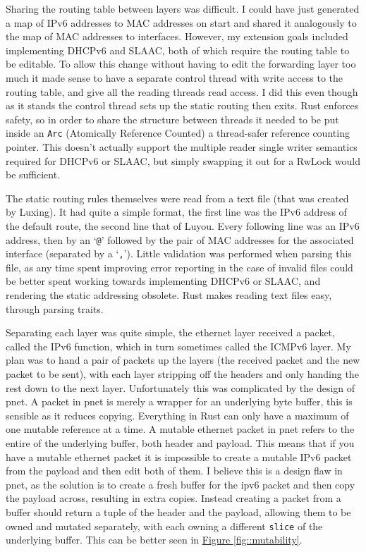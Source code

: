 \documentclass[12pt,a4paper,twoside,openright]{report}
\begin{document}
\bigskip

Sharing the routing table between layers was difficult.  I could have just generated a map of IPv6 addresses to MAC addresses on start and shared it analogously to the map of MAC addresses to interfaces. However, my extension goals included implementing DHCPv6 and SLAAC, both of which require the routing table to be editable.  To allow this change without having to edit the forwarding layer too much it made sense to have a separate control thread with write access to the routing table, and give all the reading threads read access.  I did this even though as it stands the control thread sets up the static routing then exits.  Rust enforces safety, so in order to share the structure between threads it needed to be put inside an \verb!Arc! (Atomically Reference Counted)\cite{rust_arc} a thread-safer reference counting pointer.  This doesn't actually support the multiple reader single writer semantics required for DHCPv6 or SLAAC, but simply swapping it out for a RwLock\cite{rust_rwlock} would be sufficient.

\bigskip

The static routing rules themselves were read from a text file (that was created by Luxing). It had quite a simple format, the first line was the IPv6 address of the default route, the second line that of Luyou.  Every following line was an IPv6 address, then by an `\verb!@!' followed by the pair of MAC addresses for the associated interface (separated by a `\verb!,!').  Little validation was performed when parsing this file, as any time spent improving error reporting in the case of invalid files could be better spent working towards implementing DHCPv6 or SLAAC, and rendering the static addressing obsolete. Rust makes reading text files easy, through parsing traits.

\bigskip

Separating each layer was quite simple, the ethernet layer received a packet, called the IPv6 function, which in turn sometimes called the ICMPv6 layer.  My plan was to hand a pair of packets up the layers (the received packet and the new packet to be sent), with each layer stripping off the headers and only handing the rest down to the next layer.  Unfortunately this was complicated by the design of pnet.  A packet in pnet is merely a wrapper for an underlying byte buffer, this is sensible as it reduces copying.  Everything in Rust can only have a maximum of one mutable reference at a time.  A mutable ethernet packet in pnet refers to the entire of the underlying buffer, both header and payload.  This means that if you have a mutable ethernet packet it is impossible to create a mutable IPv6 packet from the payload and then edit both of them.  I believe this is a design flaw in pnet, as the solution is to create a fresh buffer for the ipv6 packet and then copy the payload across, resulting in extra copies. Instead creating a packet from a buffer should return a tuple of the header and the payload, allowing them to be owned and mutated separately, with each owning a different \verb!slice! of the underlying buffer. This can be better seen in  \hyperref[fig::mutability]{Figure }\ref{fig::mutability}.
\end{document}
